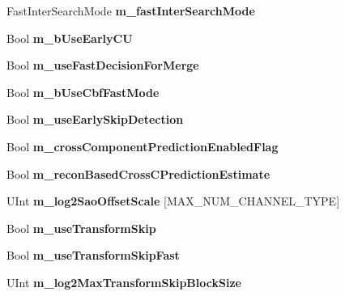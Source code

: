 \begin{DoxyCompactItemize}
Fast\+Inter\+Search\+Mode {\bfseries m\+\_\+fast\+Inter\+Search\+Mode}
\item 
\mbox{\label{class_t_enc_cfg_af571174c1b3a6fcaffc4964b8b96cb7e}} 
Bool {\bfseries m\+\_\+b\+Use\+Early\+CU}
\item 
\mbox{\label{class_t_enc_cfg_a2fe3a8202314a7140f16d33e5ffc1b79}} 
Bool {\bfseries m\+\_\+use\+Fast\+Decision\+For\+Merge}
\item 
\mbox{\label{class_t_enc_cfg_a501d408b0cda38684fe7a236c954d60d}} 
Bool {\bfseries m\+\_\+b\+Use\+Cbf\+Fast\+Mode}
\item 
\mbox{\label{class_t_enc_cfg_ae423215df1bba7a91f3aaabaa1980741}} 
Bool {\bfseries m\+\_\+use\+Early\+Skip\+Detection}
\item 
\mbox{\label{class_t_enc_cfg_a5dce791b218c4597df0a4691ea05e858}} 
Bool {\bfseries m\+\_\+cross\+Component\+Prediction\+Enabled\+Flag}
\item 
\mbox{\label{class_t_enc_cfg_acba8cc0b9ac401b2852cc628d28a1a4e}} 
Bool {\bfseries m\+\_\+recon\+Based\+Cross\+C\+Prediction\+Estimate}
\item 
\mbox{\label{class_t_enc_cfg_ae9d77976717d04f38855e0a0e96345c9}} 
U\+Int {\bfseries m\+\_\+log2\+Sao\+Offset\+Scale} \mbox{[}M\+A\+X\+\_\+\+N\+U\+M\+\_\+\+C\+H\+A\+N\+N\+E\+L\+\_\+\+T\+Y\+PE\mbox{]}
\item 
\mbox{\label{class_t_enc_cfg_a9e98e18b4dfca825c7920c6762de101e}} 
Bool {\bfseries m\+\_\+use\+Transform\+Skip}
\item 
\mbox{\label{class_t_enc_cfg_a0992e3add72233b216398b8827669469}} 
Bool {\bfseries m\+\_\+use\+Transform\+Skip\+Fast}
\item 
\mbox{\label{class_t_enc_cfg_aedc9f88503acaa339511d944d6d6db76}} 
U\+Int {\bfseries m\+\_\+log2\+Max\+Transform\+Skip\+Block\+Size}
\item 
\mbox{\label{class_t_enc_cfg_ad13fbd03d172e92e7544b280cc957364}} 

\end{DoxyCompactItemize}
